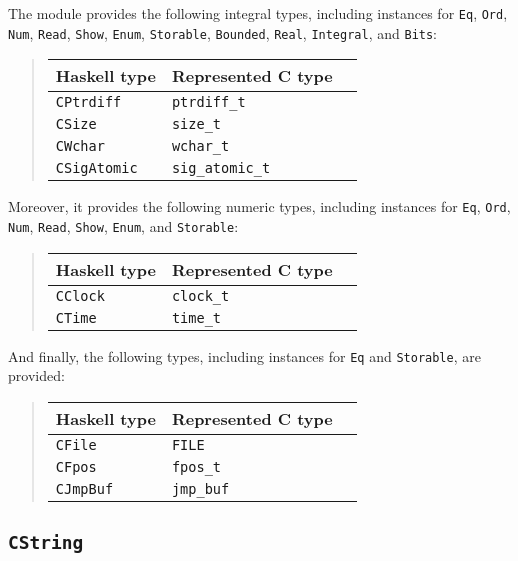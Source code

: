 \documentclass[a4paper,twoside]{article}
\newcommand{\code}[1]{\texttt{#1}}      %
\begin{document}
%
The module provides the following integral types, including instances for
\code{Eq}, \code{Ord}, \code{Num}, \code{Read}, \code{Show}, \code{Enum},
\code{Storable}, \code{Bounded}, \code{Real}, \code{Integral}, and
\code{Bits}:
%
\begin{quote}
  \begin{tabular}{|l|l|l|}
    \hline
    Haskell type     & Represented C type\\\hline\hline
    \code{CPtrdiff}  & \code{ptrdiff\_t}\\\hline
    \code{CSize}     & \code{size\_t}\\\hline
    \code{CWchar}    & \code{wchar\_t}\\\hline
    \code{CSigAtomic}& \code{sig\_atomic\_t}\\\hline
  \end{tabular}
\end{quote}
%
Moreover, it provides the following numeric types, including instances for
\code{Eq}, \code{Ord}, \code{Num}, \code{Read}, \code{Show}, \code{Enum}, and
\code{Storable}:
%
\begin{quote}
  \begin{tabular}{|l|l|l|}
    \hline
    Haskell type     & Represented C type\\\hline\hline
    \code{CClock}    & \code{clock\_t}\\\hline
    \code{CTime}     & \code{time\_t}\\\hline
  \end{tabular}
\end{quote}
%
And finally, the following types, including instances for \code{Eq} and
\code{Storable}, are provided:
%
\begin{quote}
  \begin{tabular}{|l|l|l|}
    \hline
    Haskell type     & Represented C type\\\hline\hline
    \code{CFile}     & \code{FILE}\\\hline
    \code{CFpos}     & \code{fpos\_t}\\\hline
    \code{CJmpBuf}   & \code{jmp\_buf}\\\hline
  \end{tabular}
\end{quote}

\subsection{\code{CString}}
\label{sec:CString}
\end{document}

